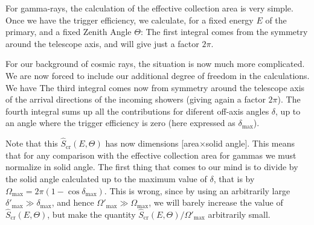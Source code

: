 \collareaIdeafig

For gamma-rays, the calculation of the effective collection area is
very simple. Once we have the trigger efficiency, we calculate, for a
fixed energy $E$ of the primary, and a fixed Zenith Angle $\Theta$:
%
\Sgammaeq
%
The first integral comes from the symmetry around the telescope axis,
and will give just a factor $2\pi$.

For our background of cosmic rays, the situation is now much more
complicated. We are now forced to include our additional degree of
freedom in the calculations. We have
%
\Screq
%
The third integral comes now from symmetry around the telescope axis
of the arrival directions of the incoming showers (giving again a
factor $2\pi$). The fourth integral sums up all the contributions for
diferent off-axis angles $\delta$, up to an angle where the trigger
efficiency is zero (here expressed as $\delta_{\mathrm{max}}$).

Note that this $\hat{S}_{\mathrm{cr}}(E,\Theta)$ has now dimensions
[area$\times$solid angle]. This means that for any comparison with the
effective collection area for gammas we must normalize in solid angle.
The first thing that comes to our mind is to divide by the solid angle
calculated up to the maximum value of $\delta$, that is by
$\Omega_{\mathrm{max}}=2\pi(1-\cos\delta_{\mathrm{max}})$. This is
wrong, since by using an arbitrarily large $\delta'_{\mathrm{max}} \gg
\delta_{\mathrm{max}}$, and hence $\Omega'_{\mathrm{max}} \gg
\Omega_{\mathrm{max}}$, we will barely increase the value of
$\hat{S}_{\mathrm{cr}}(E,\Theta)$, but make the quantity
$\hat{S}_{\mathrm{cr}}(E,\Theta)/\Omega'_{\mathrm{max}}$ arbitrarily small.



